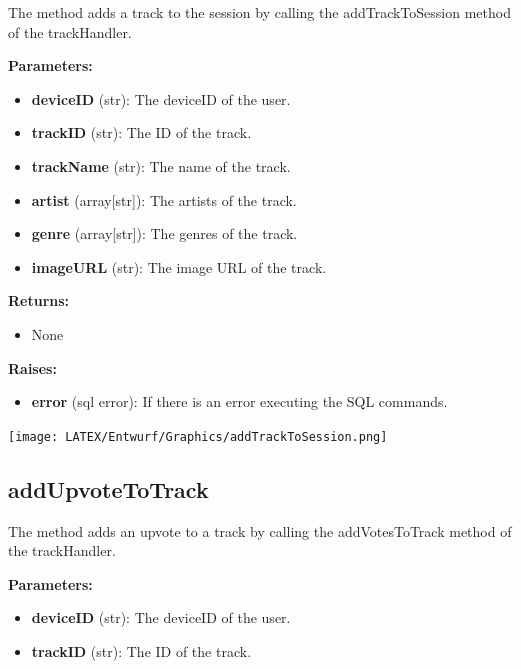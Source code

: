 \documentclass[oneside, ngerman]{sdqtechreport}
\begin{document}
The method adds a track to the session by calling the addTrackToSession method of the trackHandler.

\textbf{Parameters:}

\begin{itemize}
    \item \textbf{deviceID} (str): The deviceID of the user.
    \item \textbf{trackID} (str): The ID of the track.
    \item \textbf{trackName} (str): The name of the track.
    \item \textbf{artist} (array[str]): The artists of the track.
    \item \textbf{genre} (array[str]): The genres of the track.
    \item \textbf{imageURL} (str): The image URL of the track.
\end{itemize}

\textbf{Returns:}

\begin{itemize}
    \item None
\end{itemize}

\textbf{Raises:}

\begin{itemize}
    \item \textbf{error} (sql error): If there is an error executing the SQL commands.
\end{itemize}


\begin{center}
   \texttt{[image: LATEX/Entwurf/Graphics/addTrackToSession.png]} 
\end{center}



\subsection*{addUpvoteToTrack}

The method adds an upvote to a track by calling the addVotesToTrack method of the trackHandler.

\textbf{Parameters:}

\begin{itemize}
    \item \textbf{deviceID} (str): The deviceID of the user.
    \item \textbf{trackID} (str): The ID of the track.
\end{itemize}
\end{document}
